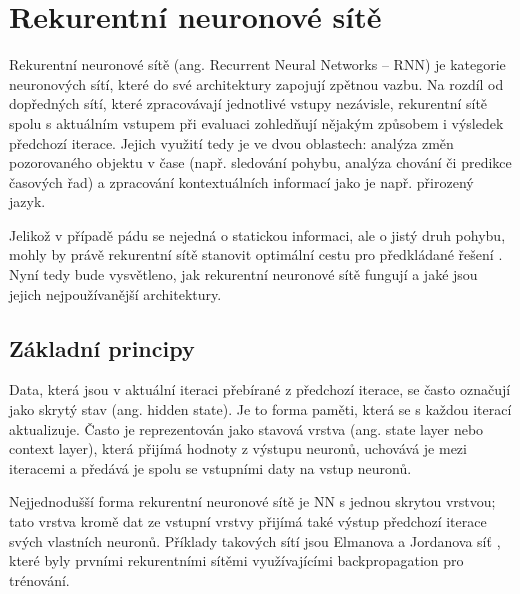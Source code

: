 \section{Rekurentní neuronové sítě}
\label{chap:RNN}

Rekurentní neuronové sítě (ang. Recurrent Neural Networks – RNN) je kategorie
neuronových sítí, které do své architektury zapojují zpětnou vazbu. Na rozdíl
od dopředných sítí, které zpracovávají jednotlivé vstupy nezávisle, rekurentní
sítě spolu s aktuálním vstupem při evaluaci zohledňují nějakým způsobem i
výsledek předchozí iterace. Jejich využití tedy je ve dvou oblastech: analýza
změn pozorovaného objektu v čase (např. sledování pohybu, analýza chování či
predikce časových řad) a zpracování kontextuálních informací jako je např.
přirozený jazyk.

Jelikož v případě pádu se nejedná o statickou informaci, ale o jistý druh
pohybu, mohly by právě rekurentní sítě stanovit optimální cestu pro předkládané
řešení \cite{dhruv2020image}. Nyní tedy bude vysvětleno, jak rekurentní
neuronové sítě fungují a jaké jsou jejich nejpoužívanější architektury.

\subsection{Základní principy}

Data, která jsou v aktuální iteraci přebírané z předchozí iterace, se často
označují jako skrytý stav (ang. hidden state). Je to forma paměti, která se s
každou iterací aktualizuje. Často je reprezentován jako stavová vrstva (ang.
state layer nebo context layer), která přijímá hodnoty z výstupu neuronů,
uchovává je mezi iteracemi a předává je spolu se vstupními daty na vstup
neuronů. %

Nejjednodušší forma rekurentní neuronové sítě je NN s jednou skrytou vrstvou;
tato vrstva kromě dat ze vstupní vrstvy přijímá také výstup předchozí iterace
svých vlastních neuronů. Příklady takových sítí jsou Elmanova a Jordanova síť
\cite{elman} \cite{jordan}, které byly prvními rekurentními sítěmi
využívajícími backpropagation pro trénování.

